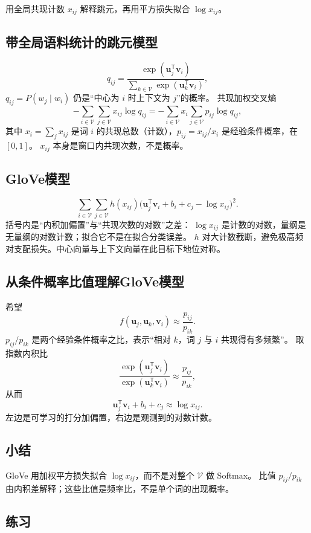 用全局共现计数 $x_{ij}$ 解释跳元，再用平方损失拟合 $\log x_{ij}$。

\subsection{带全局语料统计的跳元模型}

\[
q_{ij}
=
\frac{\exp(\bm{u}_j^{\mathsf T}\bm{v}_i)}{\sum_{k\in\mathcal{V}}\exp(\bm{u}_k^{\mathsf T}\bm{v}_i)},
\]
$q_{ij}=P(w_j\mid w_i)$ 仍是“中心为 $i$ 时上下文为 $j$”的概率。
共现加权交叉熵
\[
-\sum_{i\in\mathcal{V}}\sum_{j\in\mathcal{V}}x_{ij}\log q_{ij}
=
-\sum_{i\in\mathcal{V}}x_i\sum_{j\in\mathcal{V}}p_{ij}\log q_{ij},
\]
其中 $x_i=\sum_j x_{ij}$ 是词 $i$ 的共现总数（计数），$p_{ij}=x_{ij}/x_i$ 是经验条件概率，在 $[0,1]$。
$x_{ij}$ 本身是窗口内共现次数，不是概率。

\subsection{GloVe模型}

\[
\sum_{i\in\mathcal{V}}\sum_{j\in\mathcal{V}}
h(x_{ij})
\bigl(\bm{u}_j^{\mathsf T}\bm{v}_i+b_i+c_j-\log x_{ij}\bigr)^2.
\]
括号内是“内积加偏置”与“共现次数的对数”之差：
$\log x_{ij}$ 是计数的对数，量纲是无量纲的对数计数；拟合它不是在拟合分类误差。
$h$ 对大计数截断，避免极高频对支配损失。中心向量与上下文向量在此目标下地位对称。

\subsection{从条件概率比值理解GloVe模型}

希望
\[
f(\bm{u}_j,\bm{u}_k,\bm{v}_i)\approx\frac{p_{ij}}{p_{ik}}.
\]
$p_{ij}/p_{ik}$ 是两个经验条件概率之比，表示“相对 $k$，词 $j$ 与 $i$ 共现得有多频繁”。
取指数内积比
\[
\frac{\exp(\bm{u}_j^{\mathsf T}\bm{v}_i)}{\exp(\bm{u}_k^{\mathsf T}\bm{v}_i)}
\approx
\frac{p_{ij}}{p_{ik}},
\]
从而
\[
\bm{u}_j^{\mathsf T}\bm{v}_i+b_i+c_j\approx\log x_{ij}.
\]
左边是可学习的打分加偏置，右边是观测到的对数计数。

\subsection{小结}

GloVe 用加权平方损失拟合 $\log x_{ij}$，而不是对整个 $\mathcal{V}$ 做 Softmax。
比值 $p_{ij}/p_{ik}$ 由内积差解释；这些比值是频率比，不是单个词的出现概率。

\subsection{练习}

